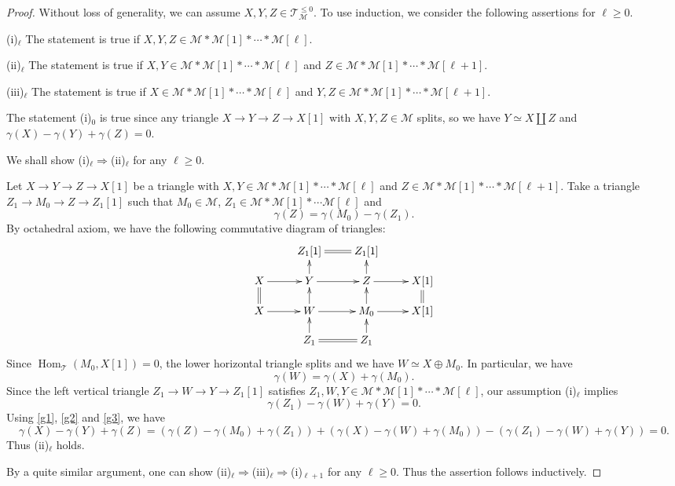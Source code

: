 \documentclass[a4paper,reqno]{amsart}
\theoremstyle{definition}
\newcommand{\TT}{{\mathcal T}}
\newcommand{\MM}{{\mathcal M}}
\newcommand{\Hom}{\operatorname{Hom}\nolimits}
\begin{document}
\begin{proof}
Without loss of generality, we can assume $X,Y,Z\in\TT_{\MM}^{\le0}$.
To use induction, we consider the following assertions for $\ell\ge0$.

(i)$_\ell$ The statement is true if $X,Y,Z\in \MM*\MM[1]*\cdots*\MM[\ell]$.

(ii)$_\ell$ The statement is true if $X,Y\in \MM*\MM[1]*\cdots*\MM[\ell]$ and $Z\in\MM*\MM[1]*\cdots*\MM[\ell+1]$.

(iii)$_\ell$ The statement is true if $X\in \MM*\MM[1]*\cdots*\MM[\ell]$ and $Y,Z\in\MM*\MM[1]*\cdots*\MM[\ell+1]$.

The statement (i)$_0$ is true since any triangle $X\to Y\to Z\to X[1]$ with $X,Y,Z\in\MM$ splits,
so we have $Y\simeq X\coprod Z$ and $\gamma(X)-\gamma(Y)+\gamma(Z)=0$.

We shall show (i)$_\ell\Rightarrow$(ii)$_\ell$ for any $\ell\ge0$.

Let $X\to Y\to Z\to X[1]$ be a triangle with $X,Y\in \MM*\MM[1]*\cdots*\MM[\ell]$ and $Z\in\MM*\MM[1]*\cdots*\MM[\ell+1]$.
Take a triangle $Z_1\to M_0\to Z\to Z_1[1]$ such that $M_0\in\MM$, $Z_1\in\MM*\MM[1]*\cdots\MM[\ell]$ and
\begin{equation}\label{g1}
\gamma(Z)=\gamma(M_0)-\gamma(Z_1).
\end{equation}
By octahedral axiom, we have the following commutative diagram of triangles:
\[\xymatrix@R=.4cm{
&Z_1[1]\ar@{=}[r]&Z_1[1]\\
X\ar[r]&Y\ar[r]\ar[u]&Z\ar[r]\ar[u]&X[1]\\
X\ar[r]\ar@{=}[u]&W\ar[r]\ar[u]&M_0\ar[r]\ar[u]&X[1]\ar@{=}[u]\\
&Z_1\ar@{=}[r]\ar[u]&Z_1\ar[u].
}\]
Since $\Hom_{\TT}(M_0,X[1])=0$, the lower horizontal triangle splits and we have $W\simeq X\oplus M_0$. In particular, we have
\begin{equation}\label{g2}
\gamma(W)=\gamma(X)+\gamma(M_0).
\end{equation}
Since the left vertical triangle $Z_1\to W\to Y\to Z_1[1]$
satisfies $Z_1,W,Y\in\MM*\MM[1]*\cdots*\MM[\ell]$,
our assumption (i)$_\ell$ implies
\begin{equation}\label{g3}
\gamma(Z_1)-\gamma(W)+\gamma(Y)=0.
\end{equation}
Using \eqref{g1}, \eqref{g2} and \eqref{g3}, we have
\[\gamma(X)-\gamma(Y)+\gamma(Z)=
(\gamma(Z)-\gamma(M_0)+\gamma(Z_1))+(\gamma(X)-\gamma(W)+\gamma(M_0))-(\gamma(Z_1)-\gamma(W)+\gamma(Y))=0.\]
Thus (ii)$_\ell$ holds.

By a quite similar argument, one can show (ii)$_\ell\Rightarrow$(iii)$_\ell\Rightarrow$(i)$_{\ell+1}$ for any $\ell\ge0$.
Thus the assertion follows inductively.
\end{proof}
\end{document}
